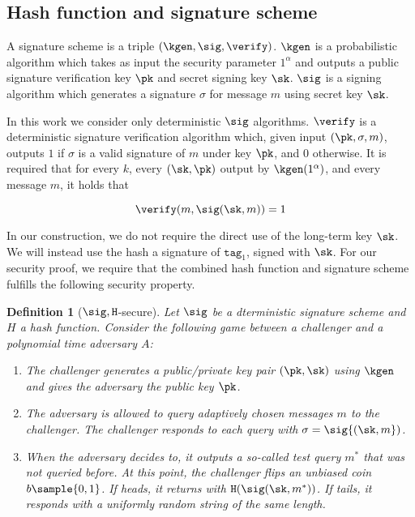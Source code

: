 \documentclass{article}
\newtheorem{definition}[theorem]{Definition}
\begin{document}
{%

\subsection{Hash function and signature scheme}

A signature scheme is a triple $(\kgen, \sig, \verify)$. $\kgen$ is a probabilistic algorithm which takes as input the security parameter $1^\alpha$ and outputs a public signature verification key $\pk$ and secret signing key $\sk$. $\sig$ is a signing algorithm which generates a signature $\sigma$ for message $m$ using secret key $\sk$. 

In this work we consider only deterministic $\sig$ algorithms. $\verify$ is a deterministic signature verification algorithm which, given input $(\pk, \sigma, m)$, outputs $1$ if $\sigma$ is a valid signature of $m$ under key $\pk$, and $0$ otherwise. It is required that for every $k$, every $(\sk, \pk)$ output by $\kgen (1^\alpha)$, and every message $m$, it holds that

$$\verify (m , \sig ({\sk, m})) = 1$$

In our construction, we do not require the direct use of the long-term key $\sk$. We will instead use the hash a signature of $\texttt{tag}_1$, signed with $\sk$. For our security proof, we require that the combined hash function and signature scheme fulfills the following  security property.

\begin{definition}[$\sig, \texttt{H}$-secure]Let $\sig$ be a dterministic signature scheme and $H$ a hash function.
Consider the following game between a challenger and a polynomial time adversary $A$:

\begin{enumerate}
\item The challenger generates a public/private key pair $(\pk, \sk)$ using $\kgen$ and gives the adversary the public key $\pk$. %

\item The adversary is allowed to query adaptively chosen messages $m$ to the challenger. The
challenger responds to each query with $\sigma=
\sig{(\sk, m})$. 

\item When the adversary decides to, it outputs a so-called test query $m^*$ that was not queried before. At this point, the challenger flips an unbiased coin $b \sample \{0, 1\}$. If heads, it returns with $ \texttt{H}(\sig (\sk, m^*))$. If tails, it responds with a uniformly random string of the same length.


\end{enumerate}
\end{definition}}
\end{document}
